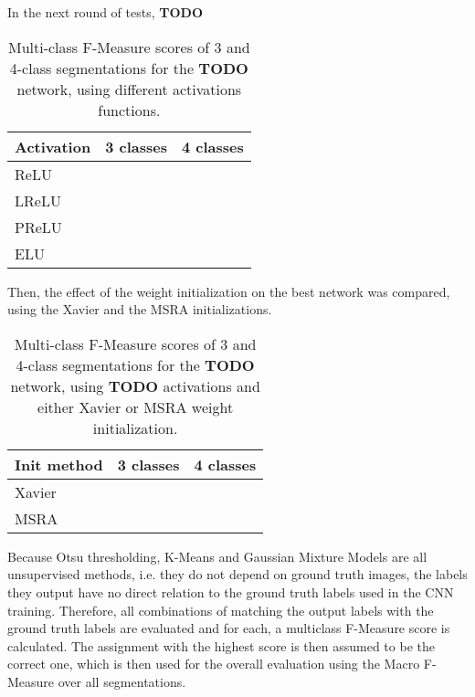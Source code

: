In the next round of tests, \textbf{TODO}


\begin {table}
	\centering
	\begin {tabular}[!ht]{|l|c|c|}
		\hline
		\textbf{Activation}& \textbf{3 classes}& \textbf{4 classes}\\ \hline
		ReLU& & \\ \hline
		LReLU& & \\ \hline
		PReLU& & \\ \hline
		ELU& & \\ \hline
	\end {tabular}
\caption[Multi-Class F-Measure scores for networks with different activation functions.]{Multi-class F-Measure scores of 3 and 4-class segmentations for the \textbf{TODO} network, using different activations functions.}
\end {table}

\noindent Then, the effect of the weight initialization on the best network was compared, using the Xavier and the MSRA initializations.

\begin {table}
	\centering
	\begin {tabular}[!ht]{|l|c|c|}
		\hline
		\textbf{Init method}& \textbf{3 classes}& \textbf{4 classes}\\ \hline
		Xavier& & \\ \hline
		MSRA& & \\ \hline
	\end {tabular}
\caption[Multi-Class F-Measure scores for networks with Xavier and MSRA weight initialization.]{Multi-class F-Measure scores of 3 and 4-class segmentations for the \textbf{TODO} network, using \textbf{TODO} activations and either Xavier or MSRA weight initialization.}
\end {table}



\noindent Because Otsu thresholding, K-Means and Gaussian Mixture Models are all unsupervised methods, i.e. they do not depend on ground truth images, the labels they output have no direct relation to the ground truth labels used in the CNN training. Therefore, all combinations of matching the output labels with the ground truth labels are evaluated and for each, a multiclass F-Measure score is calculated. The assignment with the highest score is then assumed to be the correct one, which is then used for the overall evaluation using the Macro F-Measure over all segmentations.\\

